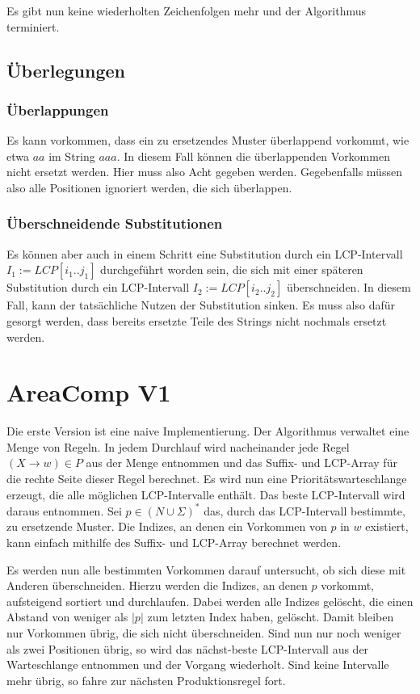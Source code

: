 Es gibt nun keine wiederholten Zeichenfolgen mehr und der Algorithmus terminiert.

\subsection{Überlegungen}

\subsubsection{Überlappungen}

Es kann vorkommen, dass ein zu ersetzendes Muster überlappend vorkommt, wie etwa $aa$ im String $aaa$. In diesem Fall können die überlappenden Vorkommen nicht ersetzt werden. Hier muss also Acht gegeben werden. Gegebenfalls müssen also alle Positionen ignoriert werden, die sich überlappen.

\subsubsection{Überschneidende Substitutionen}

Es können aber auch in einem Schritt eine Substitution durch ein LCP-Intervall $I_1 := LCP[i_1..j_1]$ durchgeführt worden sein, die sich mit einer späteren Substitution durch ein LCP-Intervall $I_2 := LCP[i_2..j_2]$ überschneiden. In diesem Fall, kann der tatsächliche Nutzen der Substitution sinken. Es muss also dafür gesorgt werden, dass bereits ersetzte Teile des Strings nicht nochmals ersetzt werden.


\section{AreaComp V1}

Die erste Version ist eine naive Implementierung. Der Algorithmus verwaltet eine Menge von Regeln. In jedem Durchlauf wird nacheinander jede Regel $(X \rightarrow w) \in P$ aus der Menge entnommen und das Suffix- und LCP-Array für die rechte Seite dieser Regel berechnet. Es wird nun eine Prioritätswarteschlange erzeugt, die alle möglichen LCP-Intervalle enthält. Das beste LCP-Intervall wird daraus entnommen. Sei $p \in (N \cup \Sigma)^*$ das, durch das LCP-Intervall bestimmte, zu ersetzende Muster. Die Indizes, an denen ein Vorkommen von $p$ in $w$ existiert, kann einfach mithilfe des Suffix- und LCP-Array berechnet werden.

Es werden nun alle bestimmten Vorkommen darauf untersucht, ob sich diese mit Anderen überschneiden. Hierzu werden die Indizes, an denen $p$ vorkommt, aufsteigend sortiert und durchlaufen. Dabei werden alle Indizes gelöscht, die einen Abstand von weniger als $|p|$ zum letzten Index haben, gelöscht. Damit bleiben nur Vorkommen übrig, die sich nicht überschneiden. Sind nun nur noch weniger als zwei Positionen übrig, so wird das nächst-beste LCP-Intervall aus der Warteschlange entnommen und der Vorgang wiederholt. Sind keine Intervalle mehr übrig, so fahre zur nächsten Produktionsregel fort.

